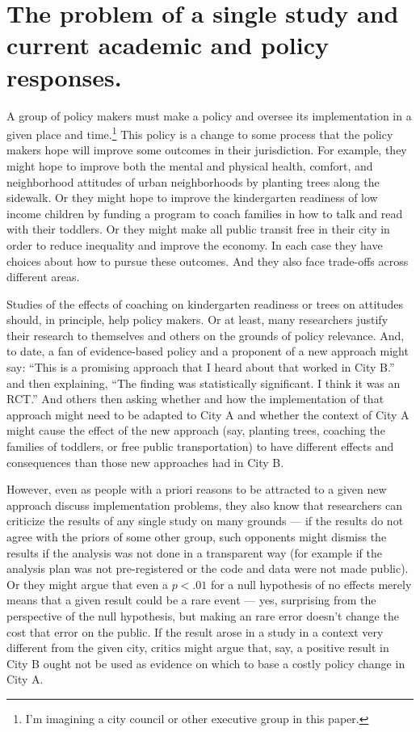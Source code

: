 \documentclass[
  11pt,
]{article}
\begin{document}
\hypertarget{the-problem-of-a-single-study-and-current-academic-and-policy-responses.}{%
\section{The problem of a single study and current academic and policy
responses.}\label{the-problem-of-a-single-study-and-current-academic-and-policy-responses.}}

A group of policy makers must make a policy and oversee its
implementation in a given place and time.\footnote{I'm imagining a city
  council or other executive group in this paper.} This policy is a
change to some process that the policy makers hope will improve some
outcomes in their jurisdiction. For example, they might hope to improve
both the mental and physical health, comfort, and neighborhood attitudes
of urban neighborhoods by planting trees along the sidewalk. Or they
might hope to improve the kindergarten readiness of low income children
by funding a program to coach families in how to talk and read with
their toddlers. Or they might make all public transit free in their city
in order to reduce inequality and improve the economy. In each case they
have choices about how to pursue these outcomes. And they also face
trade-offs across different areas.

Studies of the effects of coaching on kindergarten readiness or trees on
attitudes should, in principle, help policy makers. Or at least, many
researchers justify their research to themselves and others on the
grounds of policy relevance. And, to date, a fan of evidence-based
policy and a proponent of a new approach might say: ``This is a
promising approach that I heard about that worked in City B.'' and then
explaining, ``The finding was statistically significant. I think it was
an RCT.'' And others then asking whether and how the implementation of
that approach might need to be adapted to City A and whether the context
of City A might cause the effect of the new approach (say, planting
trees, coaching the families of toddlers, or free public transportation)
to have different effects and consequences than those new approaches had
in City B.

However, even as people with a priori reasons to be attracted to a given
new approach discuss implementation problems, they also know that
researchers can criticize the results of any single study on many
grounds --- if the results do not agree with the priors of some other
group, such opponents might dismiss the results if the analysis was not
done in a transparent way (for example if the analysis plan was not
pre-registered or the code and data were not made public). Or they might
argue that even a \(p < .01\) for a null hypothesis of no effects merely
means that a given result could be a rare event --- yes, surprising from
the perspective of the null hypothesis, but making an rare error doesn't
change the cost that error on the public. If the result arose in a study
in a context very different from the given city, critics might argue
that, say, a positive result in City B ought not be used as evidence on
which to base a costly policy change in City A.
\end{document}
